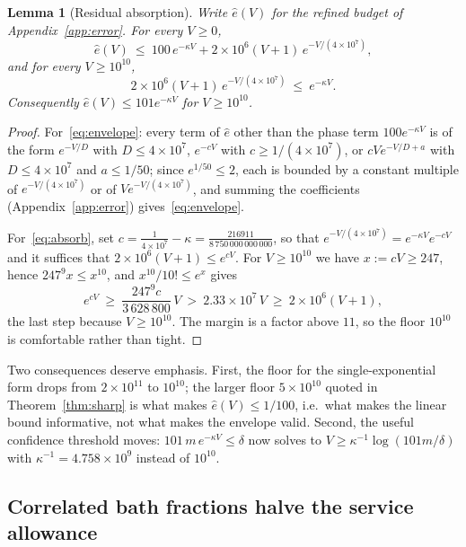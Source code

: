 \documentclass[11pt,a4paper]{article}
\theoremstyle{plain}
\newtheorem{lemma}[theorem]{Lemma}
\theoremstyle{definition}
\theoremstyle{remark}
\begin{document}
\begin{lemma}[Residual absorption]\label{lem:absorb}
Write $\widehat e(V)$ for the refined budget of Appendix~\ref{app:error}. For every $V\ge0$,
\begin{equation}\label{eq:envelope}
\widehat e(V)\ \le\ 100\,e^{-\kappa V}+2\times10^{6}(V+1)\,e^{-V/(4\times10^{7})},
\end{equation}
and for every $V\ge10^{10}$,
\begin{equation}\label{eq:absorb}
2\times10^{6}(V+1)\,e^{-V/(4\times10^{7})}\ \le\ e^{-\kappa V}.
\end{equation}
Consequently $\widehat e(V)\le101e^{-\kappa V}$ for $V\ge10^{10}$.
\end{lemma}
\begin{proof}
For~\eqref{eq:envelope}: every term of $\widehat e$ other than the phase term $100e^{-\kappa V}$ is of the form $e^{-V/D}$ with $D\le4\times10^{7}$, $e^{-cV}$ with $c\ge1/(4\times10^{7})$, or $cVe^{-V/D+a}$ with $D\le4\times10^{7}$ and $a\le1/50$; since $e^{1/50}\le2$, each is bounded by a constant multiple of $e^{-V/(4\times10^7)}$ or of $V e^{-V/(4\times10^7)}$, and summing the coefficients (Appendix~\ref{app:error}) gives~\eqref{eq:envelope}.

For~\eqref{eq:absorb}, set $c=\tfrac1{4\times10^{7}}-\kappa=\tfrac{216911}{8\,750\,000\,000\,000}$, so that $e^{-V/(4\times10^7)}=e^{-\kappa V}e^{-cV}$ and it suffices that $2\times10^{6}(V+1)\le e^{cV}$. For $V\ge10^{10}$ we have $x:=cV\ge247$, hence $247^{9}x\le x^{10}$, and $x^{10}/10!\le e^{x}$ gives
\[
e^{cV}\ \ge\ \frac{247^{9}c}{3\,628\,800}\,V\ >\ 2.33\times10^{7}\,V\ \ge\ 2\times10^{6}(V+1),
\]
the last step because $V\ge10^{10}$. The margin is a factor above $11$, so the floor $10^{10}$ is comfortable rather than tight.
\end{proof}

Two consequences deserve emphasis. First, the floor for the single-exponential form drops from $2\times10^{11}$ to $10^{10}$; the larger floor $5\times10^{10}$ quoted in Theorem~\ref{thm:sharp} is what makes $\widehat e(V)\le1/100$, i.e.\ what makes the linear bound informative, not what makes the envelope valid. Second, the useful confidence threshold moves: $101\,m\,e^{-\kappa V}\le\delta$ now solves to $V\ge\kappa^{-1}\log(101m/\delta)$ with $\kappa^{-1}=4.758\times10^{9}$ instead of $10^{10}$.

\subsection{Correlated bath fractions halve the service allowance}\label{sec:sharp-service}
\end{document}
